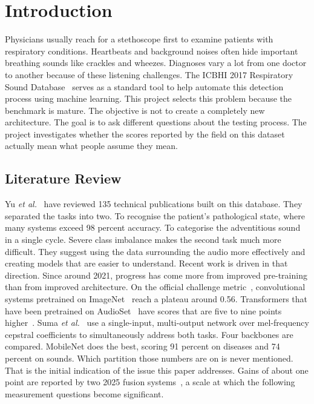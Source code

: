 \documentclass[journal,onecolumn]{IEEEtran}
\begin{document}
\section{Introduction}
\label{sec:intro}

Physicians usually reach for a stethoscope first to examine patients with respiratory conditions. Heartbeats and background noises often hide important breathing sounds like crackles and wheezes. Diagnoses vary a lot from one doctor to another because of these listening challenges. The ICBHI 2017 Respiratory Sound Database~\cite{rocha2019icbhi} serves as a standard tool to help automate this detection process using machine learning. This project selects this problem because the benchmark is mature. The objective is not to create a completely new architecture. The goal is to ask different questions about the testing process. The project investigates whether the scores reported by the field on this dataset actually mean what people assume they mean.

\subsection{Literature Review}
\label{subsec:lit}

Yu \emph{et al.}~\cite{electronics2025review} have reviewed 135 technical publications
built on this database. They separated the tasks into two. To recognise the patient's
pathological state, where many systems exceed 98 percent accuracy. To categorise the
adventitious sound in a single cycle. Severe class imbalance makes the second task much
more difficult. They suggest using the data surrounding the audio more effectively and
creating models that are easier to understand. Recent work is driven in that direction.
Since around 2021, progress has come more from improved pre-training than from improved
architecture. On the official challenge metric~\cite{respirenet2021}, convolutional
systems pretrained on ImageNet~\cite{deng2009imagenet} reach a plateau around 0.56.
Transformers that have been pretrained on AudioSet~\cite{gemmeke2017audioset} have
scores that are five to nine points higher~\cite{bae2023patchmix,bts2024,pafa2025}. Suma
\emph{et al.}~\cite{suma2025mtl} use a single-input, multi-output network over
mel-frequency cepstral coefficients to simultaneously address both tasks. Four
backbones are compared. MobileNet does the best, scoring 91 percent on diseases and 74
percent on sounds. Which partition those numbers are on is never mentioned. That is the
initial indication of the issue this paper addresses. Gains of about one point are
reported by two 2025 fusion systems~\cite{adffnet2025,bspc2025fusion}, a scale at which
the following measurement questions become significant.
\end{document}
